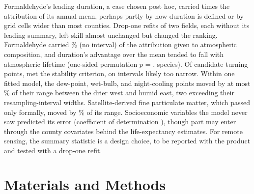 \documentclass[sensors,article,submit,moreauthors,pdftex]{Definitions/mdpi}
\begin{document}
Formaldehyde's leading duration, a case chosen post hoc, carried \HchoRatio{} times
the attribution of its annual mean, perhaps partly by how duration is defined or by grid cells wider than most counties. Drop-one refits of two fields, each
without its leading summary, left skill almost unchanged but changed
the ranking. Formaldehyde carried \FamHchoPct{}\% (no interval) of the attribution given to
atmospheric composition, and duration's advantage over the mean tended to fall with
atmospheric lifetime (one-sided permutation $p$ = \LtPermP{}, \LtSpecies{} species). Of
\TpTotal{} candidate turning points, \TpStable{} met the stability criterion, on intervals likely too narrow.
Within one fitted model, the dew-point, wet-bulb, and night-cooling points moved by at most
\RegMerTripletMax{}\% of their range between the drier west and humid east, two exceeding their resampling-interval widths. Satellite-derived fine particulate matter, which passed only formally, moved by \RegMerPm{}\% of its range.
Socioeconomic variables the model never saw predicted its error (coefficient
of determination \ResSdohRtwo{}), though part may enter through the county covariates behind the life-expectancy estimates. For remote sensing, the summary statistic
is a design choice, to be reported with
the product and tested with a drop-one refit.

\section{Materials and Methods}
\label{sec:methods}
\end{document}
